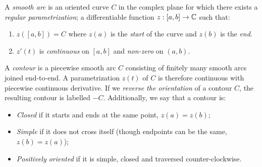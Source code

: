 \begin{defn}{}{}
	A \emph{smooth arc} is an oriented curve $C$ in the complex plane for which there exists a \emph{regular parametrization}; a differentiable function $z:[a,b]\to\mathbb{C}$ such that:\vspace{-2pt}
	\begin{enumerate}\itemsep2pt
	  \item $z([a,b])=C$ where $z(a)$ is the \emph{start} of the curve and $z(b)$ is the \emph{end}.
	  \item $z'(t)$ is \emph{continuous}\footnotemark{} on $[a,b]$ and \emph{non-zero} on $(a,b)$.
	\end{enumerate}
	A \emph{contour} is a piecewise smooth arc $C$ consisting of finitely many smooth arcs joined end-to-end. A parametrization $z(t)$ of $C$ is therefore continuous with piecewise continuous derivative.\smallbreak
	If we \emph{reverse the orientation} of a contour $C$, the resulting contour is labelled $-C$.\smallbreak
	Additionally, we say that a contour is:\vspace{-2pt}
	\begin{itemize}\itemsep2pt
	  \item \emph{Closed} if it starts and ends at the same point, $z(a)=z(b)$;
	  \item \emph{Simple} if it does not cross itself (though endpoints can be the same, $z(b)=z(a)$);
	  \item \emph{Positively oriented} if it is simple, closed and traversed counter-clockwise.
	\end{itemize}
\end{defn}


